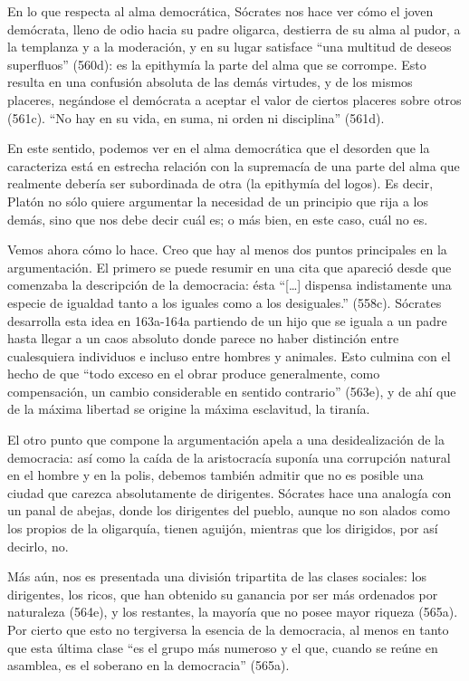 En lo que respecta al alma democrática,
Sócrates nos hace ver cómo el joven
demócrata, lleno de odio hacia su padre
oligarca, destierra de su alma al pudor, a la
templanza y a la moderación, y en su lugar
satisface ``una multitud de deseos
superfluos'' (560d): es la epithymía la parte
del alma que se corrompe. Esto resulta en una
confusión absoluta de las demás virtudes, y
de los mismos placeres, negándose el
demócrata a aceptar el valor de ciertos
placeres sobre otros (561c). ``No hay en su
vida, en suma, ni orden ni disciplina''
(561d).

En este sentido, podemos ver en el alma
democrática que el desorden que la
caracteriza está en estrecha relación con la
supremacía de una parte del alma que
realmente debería ser subordinada de otra (la
epithymía del logos). Es decir, Platón no
sólo quiere argumentar la necesidad de un
principio que rija a los demás, sino que nos
debe decir cuál es; o más bien, en este caso,
cuál no es.

Vemos ahora cómo lo hace. Creo que hay al
menos dos puntos principales en la
argumentación. El primero se puede resumir en
una cita que apareció desde que comenzaba la
descripción de la democracia: ésta
``[\ldots{}] dispensa indistamente una
especie de igualdad tanto a los iguales como
a los desiguales.'' (558c). Sócrates
desarrolla esta idea en 163a-164a partiendo
de un hijo que se iguala a un padre hasta
llegar a un caos absoluto donde parece no
haber distinción entre cualesquiera
individuos e incluso entre hombres y
animales. Esto culmina con el hecho de que
``todo exceso en el obrar produce
generalmente, como compensación, un cambio
considerable en sentido contrario'' (563e), y
de ahí que de la máxima libertad se origine
la máxima esclavitud, la tiranía.

El otro punto que compone la argumentación
apela a una desidealización de la democracia:
así como la caída de la aristocracía suponía
una corrupción natural en el hombre y en la
polis, debemos también admitir que no es
posible una ciudad que carezca absolutamente
de dirigentes. Sócrates hace una analogía con
un panal de abejas, donde los dirigentes del
pueblo, aunque no son alados como los propios
de la oligarquía, tienen aguijón, mientras
que los dirigidos, por así decirlo, no.

Más aún, nos es presentada una división
tripartita de las clases sociales: los
dirigentes, los ricos, que han obtenido su
ganancia por ser más ordenados por naturaleza
(564e), y los restantes, la mayoría que no
posee mayor riqueza (565a). Por cierto que
esto no tergiversa la esencia de la
democracia, al menos en tanto que esta última
clase ``es el grupo más numeroso y el que,
cuando se reúne en asamblea, es el soberano
en la democracia'' (565a).

